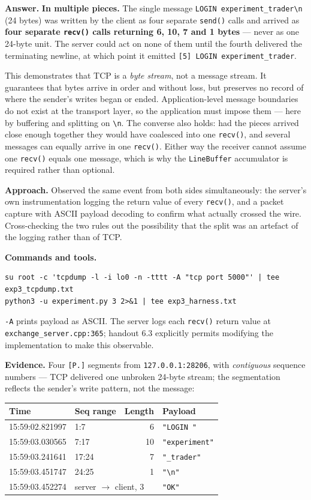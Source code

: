 \documentclass[11pt,a4paper]{article}
\newcommand{\cmd}[1]{\texttt{\small #1}}
\begin{document}
\textbf{Answer.} \textbf{In multiple pieces.} The single message
\cmd{LOGIN experiment\_trader\textbackslash n} (24 bytes) was written by the
client as four separate \cmd{send()} calls and arrived as \textbf{four separate
\cmd{recv()} calls returning 6, 10, 7 and 1 bytes} --- never as one 24-byte
unit. The server could act on none of them until the fourth delivered the
terminating newline, at which point it emitted
\cmd{[5] LOGIN experiment\_trader}.

This demonstrates that TCP is a \emph{byte stream}, not a message stream. It
guarantees that bytes arrive in order and without loss, but preserves no record
of where the sender's writes began or ended. Application-level message
boundaries do not exist at the transport layer, so the application must impose
them --- here by buffering and splitting on \verb|\n|. The converse also holds:
had the pieces arrived close enough together they would have coalesced into one
\cmd{recv()}, and several messages can equally arrive in one \cmd{recv()}.
Either way the receiver cannot assume one \cmd{recv()} equals one message, which
is why the \cmd{LineBuffer} accumulator is required rather than optional.

\textbf{Approach.} Observed the same event from both sides simultaneously: the
server's own instrumentation logging the return value of every \cmd{recv()}, and
a packet capture with ASCII payload decoding to confirm what actually crossed
the wire. Cross-checking the two rules out the possibility that the split was an
artefact of the logging rather than of TCP.

\textbf{Commands and tools.}
\begin{Verbatim}[fontsize=\small,frame=single]
su root -c 'tcpdump -l -i lo0 -n -tttt -A "tcp port 5000"' | tee exp3_tcpdump.txt
python3 -u experiment.py 3 2>&1 | tee exp3_harness.txt
\end{Verbatim}
\cmd{-A} prints payload as ASCII. The server logs each \cmd{recv()} return value
at \cmd{exchange\_server.cpp:365}; handout 6.3 explicitly permits modifying the
implementation to make this observable.

\textbf{Evidence.} Four \cmd{[P.]} segments from \cmd{127.0.0.1:28206}, with
\emph{contiguous} sequence numbers --- TCP delivered one unbroken 24-byte stream;
the segmentation reflects the sender's write pattern, not the message:

\begin{center}\small
\begin{tabular}{llrl}
\toprule
Time & Seq range & Length & Payload \\
\midrule
15:59:02.821997 & 1:7   & 6  & \cmd{"LOGIN "} \\
15:59:03.030565 & 7:17  & 10 & \cmd{"experiment"} \\
15:59:03.241641 & 17:24 & 7  & \cmd{"\_trader"} \\
15:59:03.451747 & 24:25 & 1  & \verb|"\n"| \\
15:59:03.452274 & \multicolumn{2}{l}{server $\rightarrow$ client, 3} & \cmd{"OK"} \\
\bottomrule
\end{tabular}
\end{center}
\end{document}
